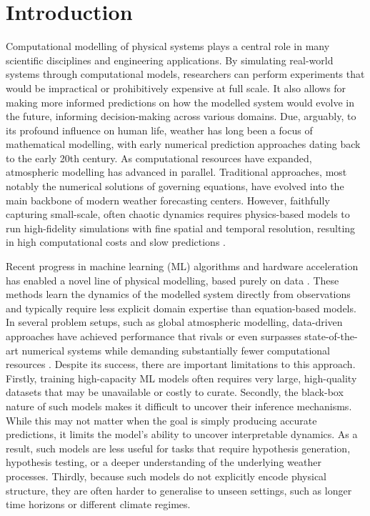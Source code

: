 \chapter{Introduction}

Computational modelling of physical systems plays a central role in many scientific disciplines and engineering applications. By simulating real-world systems through computational models, researchers can perform experiments that would be impractical or prohibitively expensive at full scale. It also allows for making more informed predictions on how the modelled system would evolve in the future, informing decision-making across various domains. Due, arguably, to its profound influence on human life, weather has long been a focus of mathematical modelling, with early numerical prediction approaches dating back to the early 20th century\cite{primitiveeqs, richardson1922weather}. As computational resources have expanded, atmospheric modelling has advanced in parallel. Traditional approaches, most notably the numerical solutions of governing equations, have evolved into the main backbone of modern weather forecasting centers. However, faithfully capturing small-scale, often chaotic dynamics requires physics-based models to run high-fidelity simulations with fine spatial and temporal resolution, resulting in high computational costs and slow predictions \cite{ECMWF2025_HPC_weather}.

Recent progress in machine learning (ML) algorithms and hardware acceleration has enabled a novel line of physical modelling, based purely on data \cite{rosenblatt1957perceptron, raissi2017physics, scher2018toward}. These methods learn the dynamics of the modelled system directly from observations and typically require less explicit domain expertise than equation-based models. In several problem setups, such as global atmospheric modelling, data-driven approaches have achieved performance that rivals or even surpasses state-of-the-art numerical systems while demanding substantially fewer computational resources \cite{aurora, graphcast, fourcastnet}. Despite its success, there are important limitations to this approach. Firstly, training high-capacity ML models often requires very large, high-quality datasets that may be unavailable or costly to curate. Secondly, the black-box nature of such models makes it difficult to uncover their inference mechanisms. While this may not matter when the goal is simply producing accurate predictions, it limits the model’s ability to uncover interpretable dynamics. As a result, such models are less useful for tasks that require hypothesis generation, hypothesis testing, or a deeper understanding of the underlying weather processes. Thirdly, because such models do not explicitly encode physical structure, they are often harder to generalise to unseen settings, such as longer time horizons or different climate regimes.

